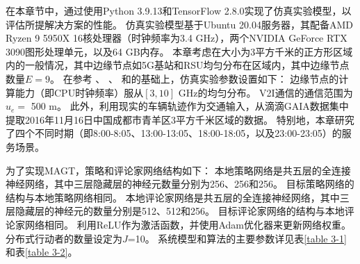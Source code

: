 在本章节中，通过使用Python 3.9.13和TensorFlow 2.8.0实现了仿真实验模型，以评估所提解决方案的性能。
仿真实验模型基于Ubuntu 20.04服务器，其配备AMD Ryzen 9 5950X 16核处理器（时钟频率为3.4 GHz），两个NVIDIA GeForce RTX 3090图形处理单元，以及64 GB内存。
本章考虑在大小为3平方千米的正方形区域内的一般情况，其中边缘节点如5G基站和RSU均匀分布在区域内，其中边缘节点数量$E=9$。
在参考 、 、 和的基础上，仿真实验参数设置如下：
边缘节点的计算能力（即CPU时钟频率）服从$[3, 10]$ GHz的均匀分布\cite{zhou2019computation}。 
V2I通信的通信范围为$u_e =$ 500 m\cite{zhu2021decentralized}。
此外，利用现实的车辆轨迹作为交通输入，从滴滴GAIA数据集中提取2016年11月16日中国成都市青羊区3平方千米区域的数据。
特别地，本章研究了四个不同时期（即8:00-8:05、13:00-13:05、18:00-18:05，以及23:00-23:05）的服务场景。

为了实现MAGT，策略和评论家网络结构如下：
本地策略网络是共五层的全连接神经网络，其中三层隐藏层的神经元数量分别为256、256和256。
目标策略网络的结构与本地策略网络相同。
本地评论家网络是共五层的全连接神经网络，其中三层隐藏层的神经元的数量分别是512、512和256。
目标评论家网络的结构与本地评论家网络相同。
利用ReLU作为激活函数，并使用Adam优化器来更新网络权重。
分布式行动者的数量设定为$J$=10。
系统模型和算法的主要参数详见表\ref{table 3-1}和表\ref{table 3-2}。

\begin{table}[h]\small
\centering
{}
\label{table 3-1}
\end{table}

